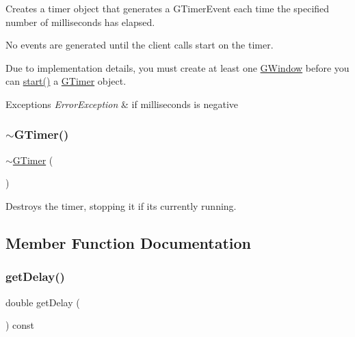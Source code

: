 Creates a timer object that generates a {\ttfamily G\+Timer\+Event} each time the specified number of milliseconds has elapsed. 

No events are generated until the client calls {\ttfamily start} on the timer.

Due to implementation details, you must create at least one \mbox{\hyperlink{classsgl_1_1GWindow}{G\+Window}} before you can \mbox{\hyperlink{classsgl_1_1GTimer_a60de64d75454385b23995437f1d72669}{start()}} a \mbox{\hyperlink{classsgl_1_1GTimer}{G\+Timer}} object.


\begin{DoxyExceptions}{Exceptions}
{\em Error\+Exception} & if milliseconds is negative \\
\hline
\end{DoxyExceptions}
\mbox{\label{classsgl_1_1GTimer_a2f693771957cae3efd9bfc952c543961}} 
\subsubsection{\texorpdfstring{$\sim$\+G\+Timer()}{~GTimer()}}
{\footnotesize\ttfamily $\sim$\mbox{\hyperlink{classsgl_1_1GTimer}{G\+Timer}} (\begin{DoxyParamCaption}{ }\end{DoxyParamCaption})}



Destroys the timer, stopping it if it\textquotesingle{}s currently running. 



\subsection{Member Function Documentation}
\mbox{\label{classsgl_1_1GTimer_a73d6fbcedb3f4c8379a76161503dc8f8}} 
\subsubsection{\texorpdfstring{get\+Delay()}{getDelay()}}
{\footnotesize\ttfamily double get\+Delay (\begin{DoxyParamCaption}{ }\end{DoxyParamCaption}) const}



